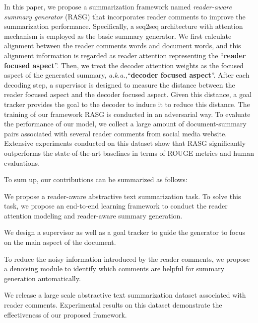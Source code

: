 \documentclass[letterpaper]{article} \usepackage{aaai19}  \usepackage{times}  \usepackage{helvet}  \usepackage{courier}
\newcommand{\aka}{\emph{a.k.a.,}\xspace}
\begin{document}
In this paper, we propose a summarization framework named \emph{reader-aware summary generator} (RASG) that incorporates reader comments to improve the summarization performance.
Specifically, a seq2seq architecture with attention mechanism is employed as the basic summary generator.
We first calculate alignment between the reader comments words and document words, and this alignment information is regarded as reader attention representing the ``\textbf{reader focused aspect}''.
Then, we treat the decoder attention weights as the focused aspect of the generated summary, \aka ``\textbf{decoder focused aspect}''.
After each decoding step, a supervisor is designed to measure the distance between the reader focused aspect and the decoder focused aspect.
Given this distance, a goal tracker provides the goal to the decoder to induce it to reduce this distance.
The training of our framework RASG is conducted in an adversarial way.
To evaluate the performance of our model, we collect a large amount of document-summary pairs associated with several reader comments from social media website. 
Extensive experiments conducted on this dataset show that RASG significantly outperforms the state-of-the-art baselines in terms of ROUGE metrics and human evaluations.


To sum up, our contributions can be summarized as follows: 

 We propose a reader-aware abstractive text summarization task. To solve this task, we propose an end-to-end learning framework to conduct the reader attention modeling and reader-aware summary generation.

 We design a supervisor as well as a goal tracker to guide the generator to focus on the main aspect of the document.

 To reduce the noisy information introduced by the reader comments, we propose a denoising module to identify which comments are helpful for summary generation automatically.

 We release a large scale abstractive text summarization dataset associated with reader comments.
Experimental results on this dataset demonstrate the effectiveness of our proposed framework.
    
\end{document}
